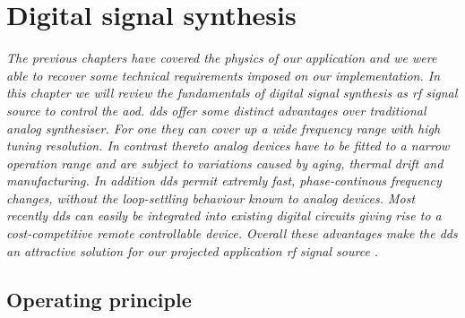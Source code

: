 \chapter{Digital signal synthesis}\label{ch:digital_signal_synthesis}

\textit{The previous chapters have covered the physics of our application and
  we were able to recover some technical requirements imposed on our
  implementation. In this chapter we will review the fundamentals of digital
  signal synthesis as \gls{rf} signal source to control the \gls{aod}.
  \gls{dds} offer some distinct advantages over traditional analog
  synthesiser. For one they can cover up a wide frequency range with high
  tuning resolution. In contrast thereto analog devices have to be fitted to
  a narrow operation range and are subject to variations caused by aging,
  thermal drift and manufacturing. In addition \gls{dds} permit extremly fast,
  phase-continous frequency changes, without the loop-settling behaviour
  known to analog devices. Most recently \gls{dds} can easily be integrated
  into existing digital circuits giving rise to a cost-competitive remote
  controllable device. Overall these advantages make the \gls{dds} an
  attractive solution for our projected application \gls{rf} signal source
  \cite{ADTutDDS}.}

\section{Operating principle}

